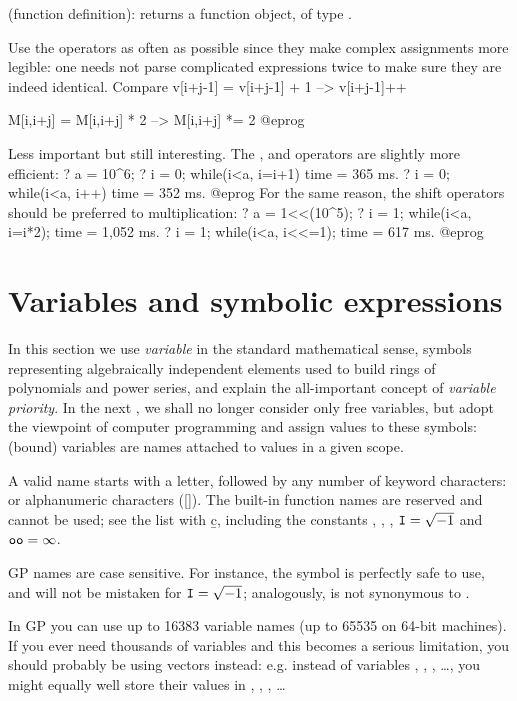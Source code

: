 \kbd{->} (function definition):  returns a
function object, of type .

 Use the \kbd{=} operators as often as possible
since they make complex assignments more legible: one needs not parse
complicated expressions twice to make sure they are indeed identical. Compare
\bprog
v[i+j-1] = v[i+j-1] + 1    -->    v[i+j-1]++

M[i,i+j] = M[i,i+j] * 2    -->    M[i,i+j] *= 2
@eprog

 Less important but still interesting. The
\kbd{++}, \kbd{--} and \kbd{=} operators are slightly more efficient:
\bprog
? a = 10^6;
? i = 0; while(i<a, i=i+1)
time = 365 ms.
? i = 0; while(i<a, i++)
time = 352 ms.
@eprog
\noindent For the same reason, the shift operators should be preferred to
multiplication:
\bprog
? a = 1<<(10^5);
? i = 1; while(i<a, i=i*2);
time = 1,052 ms.
? i = 1; while(i<a, i<<=1);
time = 617 ms.
@eprog

\section{Variables and symbolic expressions}\label{se:varsymb}
In this section we use \emph{variable} in the standard mathematical
sense, symbols representing algebraically independent elements used to build
rings of polynomials and power series, and explain the all-important concept
of \emph{variable priority}. In the next , we shall no
longer consider only free variables, but adopt the viewpoint of computer
programming and assign values to these symbols: (bound) variables are names
attached to values in a given scope.

\label{se:varname} A valid name starts with a letter,
followed by any number of keyword characters: \kbd{\_} or alphanumeric
characters ([]). The built-in function names are reserved and
cannot be used; see the list with \b{c}, including the constants ,
, , ${\tt I}=\sqrt{-1}$ and ${\tt oo} = \infty$.

GP names are case sensitive. For instance, the symbol  is perfectly
safe to use, and will not be mistaken for ${\tt I} = \sqrt{-1}$; analogously,
 is not synonymous to .

In GP you can use up to 16383 variable names (up to 65535 on 64-bit
machines). If you ever need thousands of variables and this becomes a serious
limitation, you should probably be using vectors instead: e.g. instead of
variables , , , \dots, you might equally well store
their values in , , , \dots

